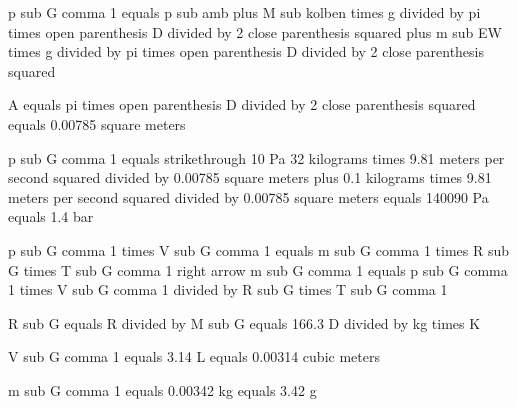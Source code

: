 p sub G comma 1 equals p sub amb plus M sub kolben times g divided by pi times open parenthesis D divided by 2 close parenthesis squared plus m sub EW times g divided by pi times open parenthesis D divided by 2 close parenthesis squared

A equals pi times open parenthesis D divided by 2 close parenthesis squared equals 0.00785 square meters

p sub G comma 1 equals strikethrough 10 Pa 32 kilograms times 9.81 meters per second squared divided by 0.00785 square meters plus 0.1 kilograms times 9.81 meters per second squared divided by 0.00785 square meters equals 140090 Pa equals 1.4 bar

p sub G comma 1 times V sub G comma 1 equals m sub G comma 1 times R sub G times T sub G comma 1 right arrow m sub G comma 1 equals p sub G comma 1 times V sub G comma 1 divided by R sub G times T sub G comma 1

R sub G equals R divided by M sub G equals 166.3 D divided by kg times K

V sub G comma 1 equals 3.14 L equals 0.00314 cubic meters

m sub G comma 1 equals 0.00342 kg equals 3.42 g